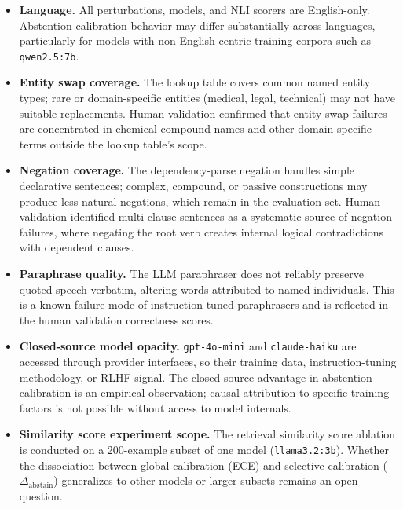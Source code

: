\documentclass[11pt]{article}
\begin{document}
\begin{itemize}[noitemsep]
  \item \textbf{Language.} All perturbations, models, and NLI scorers are English-only.
    Abstention calibration behavior may differ substantially across languages, particularly
    for models with non-English-centric training corpora such as \texttt{qwen2.5:7b}.

  \item \textbf{Entity swap coverage.} The lookup table covers common named entity types;
    rare or domain-specific entities (medical, legal, technical) may not have suitable
    replacements. Human validation confirmed that entity swap failures are concentrated in
    chemical compound names and other domain-specific terms outside the lookup table's
    scope.

  \item \textbf{Negation coverage.} The dependency-parse negation handles simple
    declarative sentences; complex, compound, or passive constructions may produce less
    natural negations, which remain in the evaluation set. Human validation identified
    multi-clause sentences as a systematic source of negation failures, where negating
    the root verb creates internal logical contradictions with dependent clauses.

  \item \textbf{Paraphrase quality.} The LLM paraphraser does not reliably preserve
    quoted speech verbatim, altering words attributed to named individuals. This is a
    known failure mode of instruction-tuned paraphrasers and is reflected in the
    human validation correctness scores.

  \item \textbf{Closed-source model opacity.} \texttt{gpt-4o-mini} and
    \texttt{claude-haiku} are accessed through provider interfaces, so their training data, instruction-tuning
    methodology, or RLHF signal. The closed-source advantage in abstention calibration is
    an empirical observation; causal attribution to specific training factors is not
    possible without access to model internals.

  \item \textbf{Similarity score experiment scope.} The retrieval similarity score
    ablation is conducted on a 200-example subset of one model (\texttt{llama3.2:3b}).
    Whether the dissociation between global calibration (ECE) and selective calibration
    ($\Delta_\text{abstain}$) generalizes to other models or larger subsets remains an
    open question.


\end{itemize}
\end{document}
